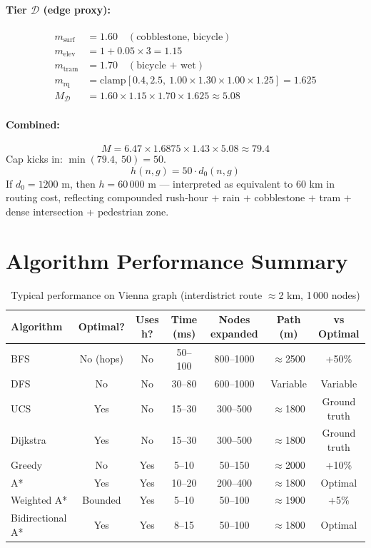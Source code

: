 \documentclass[11pt,a4paper]{article}
\begin{document}
\paragraph{Tier $\mathcal{D}$ (edge proxy):}
\begin{align*}
m_{\text{surf}}  &= 1.60 \quad(\text{cobblestone, bicycle})\\
m_{\text{elev}}  &= 1 + 0.05\times 3 = 1.15\\
m_{\text{tram}}  &= 1.70 \quad(\text{bicycle + wet})\\
m_{\text{rq}}    &= \mathrm{clamp}[0.4, 2.5,\ 1.00\times 1.30\times 1.00\times 1.25] = 1.625\\
M_{\mathcal{D}}  &= 1.60\times 1.15\times 1.70\times 1.625 \approx 5.08
\end{align*}

\paragraph{Combined:}
\[
M = 6.47\times 1.6875\times 1.43\times 5.08 \approx 79.4
\]
Cap kicks in: $\min(79.4,\ 50) = 50$.
\[
h(n,g) = 50\cdot d_0(n,g)
\]
If $d_0 = 1200$ m, then $h = 60\,000$ m — interpreted as equivalent to 60 km in routing cost, reflecting compounded rush-hour + rain + cobblestone + tram + dense intersection + pedestrian zone.

\section{Algorithm Performance Summary}

\begin{table}[H]
\centering\small
\caption{Typical performance on Vienna graph (interdistrict route $\approx$2 km, 1\,000 nodes)}
\begin{tabular}{lcccccc}
\toprule
\textbf{Algorithm} & \textbf{Optimal?} & \textbf{Uses h?} & \textbf{Time (ms)} & \textbf{Nodes expanded} & \textbf{Path (m)} & \textbf{vs Optimal} \\
\midrule
BFS & No (hops) & No & 50–100 & 800–1000 & $\approx$2500 & +50\% \\
DFS & No & No & 30–80 & 600–1000 & Variable & Variable \\
UCS & Yes & No & 15–30 & 300–500 & $\approx$1800 & Ground truth \\
Dijkstra & Yes & No & 15–30 & 300–500 & $\approx$1800 & Ground truth \\
Greedy & No & Yes & 5–10 & 50–150 & $\approx$2000 & +10\% \\
A* & Yes & Yes & 10–20 & 200–400 & $\approx$1800 & Optimal \\
Weighted A* & Bounded & Yes & 5–10 & 50–100 & $\approx$1900 & +5\% \\
Bidirectional A* & Yes & Yes & 8–15 & 50–100 & $\approx$1800 & Optimal \\
\bottomrule
\end{tabular}
\end{table}
\end{document}
